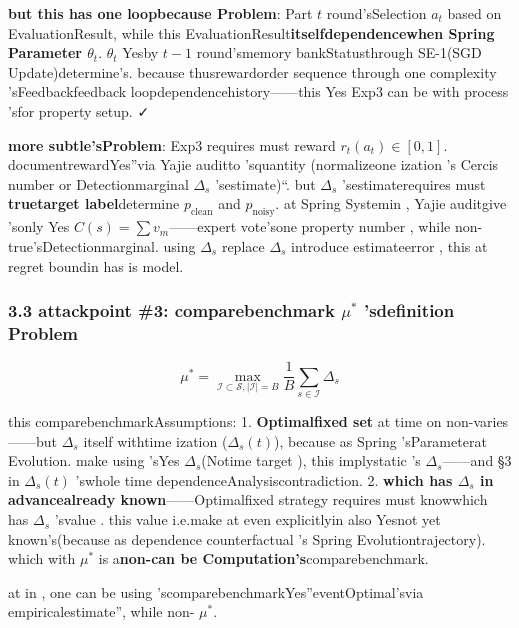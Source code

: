 \documentclass[
  12pt,
]{article}
\begin{document}
\textbf{but this has one loopbecause Problem}: Part \(t\) round'sSelection \(a_t\)
based on EvaluationResult, while this EvaluationResult\textbf{itselfdependencewhen  Spring Parameter
\(\theta_t\)}. \(\theta_t\) Yesby  \(t-1\) round'smemory bankStatusthrough  SE-1(SGD
Update)determine's. because thusrewardorder sequence through one complexity 'sFeedbackfeedback loopdependencehistory------this Yes
Exp3 can be with process 'sfor property setup. ✓

\textbf{more subtle'sProblem}: Exp3 requires must reward
\(r_t(a_t) \in [0,1]\). documentrewardYes''via Yajie auditto 'squantity (normalizeone ization 's
Cercis number or Detectionmarginal \(\Delta_s\) 'sestimate)``. but  \(\Delta_s\)
'sestimaterequires must \textbf{truetarget label}determine  \(p_{\text{clean}}\) and 
\(p_{\text{noisy}}\). at  Spring Systemin , Yajie auditgive 'sonly Yes
\(C(s) = \sum v_m\)------expert vote'sone property number , while non-true'sDetectionmarginal. using 
\(\hat{\Delta}_s\) replace \(\Delta_s\)
introduce estimateerror , this at regret boundin has is model. 

\subsubsection{\texorpdfstring{3.3 attackpoint  \#3: comparebenchmark \(\mu^*\)
'sdefinition Problem}{3.3 attackpoint  \#3: comparebenchmark \textbackslash mu\^{}* 'sdefinition Problem}}\label{ux653bux51fbux70b9-3ux6bd4ux8f83ux57faux51c6-mu-ux7684ux5b9aux4e49ux95eeux9898}

\[\mu^* = \max_{\mathcal{I} \subset \mathcal{S}, |\mathcal{I}| = B} \frac{1}{B} \sum_{s \in \mathcal{I}} \Delta_s\]

this comparebenchmarkAssumptions:  1. \textbf{Optimalfixed set }at time on non-varies------but 
\(\Delta_s\) itself withtime ization (\(\Delta_s(t)\)), because as  Spring
'sParameterat Evolution. make using 'sYes \(\Delta_s\)(Notime target ), this implystatic 's
\(\Delta_s\)------and  §3 in  \(\Delta_s(t)\) 'swhole time dependenceAnalysiscontradiction.  2.
\textbf{which has  \(\Delta_s\) in advancealready known}------Optimalfixed strategy requires must knowwhich has 
\(\Delta_s\) 'svalue . this value i.e.make at even explicitlyin also Yesnot yet known's(because as dependence
counterfactual 's Spring Evolutiontrajectory). which with  \(\mu^*\)
is a\textbf{non-can be Computation's}comparebenchmark. 

at in , one can be using 'scomparebenchmarkYes''eventOptimal'svia empiricalestimate'', while non- \(\mu^*\). 
\end{document}
